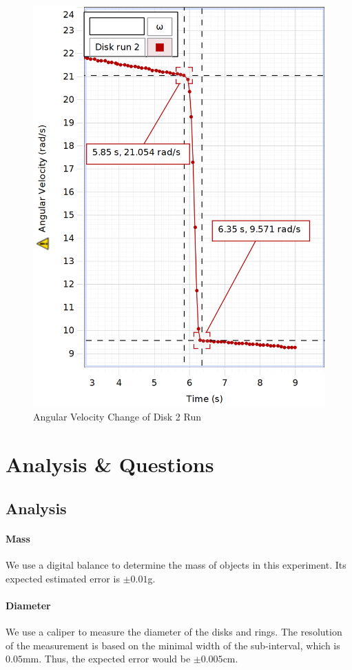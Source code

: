 \begin{figure}[H]
  \centering\includegraphics[width=15cm]{figDiskRun2.png}
  \caption{Angular Velocity Change of Disk 2 Run}
  \label{fig:DiskRun}
\end{figure}


\section{Analysis \& Questions}
\subsection{Analysis}
\paragraph{Mass}
We use a digital balance to determine the mass of objects in this experiment. Its expected estimated error is $\pm0.01$g.
\paragraph{Diameter}
We use a caliper to measure the diameter of the disks and rings. The resolution of the measurement is based on the minimal width of the sub-interval, which is $0.05$mm. Thus, the expected error would be $\pm0.005$cm.
